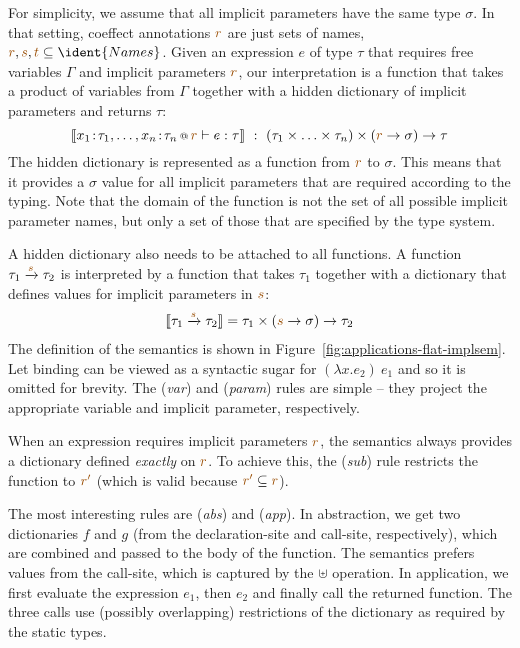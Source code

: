 For simplicity, we assume that all implicit parameters have the same type $\sigma$. In that setting, 
coeffect annotations $\aclrd{r}$ are just sets of names, \ie~$\aclrd{r}, \aclrd{s}, \aclrd{t} \subseteq \ident{Names}$.
Given an expression $e$ of type $\tau$ that requires free variables $\Gamma$ and implicit parameters 
$\aclrd{r}$, our interpretation is a function that takes a product of variables from $\Gamma$ together 
with a hidden dictionary of implicit parameters and returns $\tau$:
%
\begin{equation*}
\sem{\coctx{x_1\!:\!\tau_1, \ldots, x_n\!:\!\tau_n}{ \aclrd{r} } \vdash e : \tau} 
  ~:~ (\tau_1 \times \ldots \times \tau_n) \times (\aclrd{r} \rightarrow \sigma) \rightarrow \tau
\end{equation*}
%
The hidden dictionary is represented as a function from $\aclrd{r}$ to $\sigma$. This means that it 
provides a $\sigma$ value for all implicit parameters that are required according to the typing.
Note that the domain of the function is not the set of all possible implicit parameter names, but
only a set of those that are specified by the type system.

A hidden dictionary also needs to be attached to all functions. A function $\tau_1 \xrightarrow{\aclrd{s}} \tau_2$
is interpreted by a function that takes $\tau_1$ together with a dictionary that defines values for
implicit parameters in $\aclrd{s}$:
%
\begin{equation*}
\begin{array}{l}
\sem{\tau_1 \xrightarrow{\aclrd{s}} \tau_2} = \tau_1 \times (\aclrd{s} \rightarrow \sigma) \rightarrow \tau_2
\end{array}
\end{equation*}
%
The definition of the semantics is shown in Figure~\ref{fig:applications-flat-implsem}. Let binding
can be viewed as a syntactic sugar for $(\lambda x.e_2)~e_1$ and so it is omitted for brevity. The 
(\emph{var}) and (\emph{param}) rules are simple -- they project the appropriate variable and 
implicit parameter, respectively.

When an expression requires implicit parameters $\aclrd{r}$, the semantics always provides a 
dictionary defined \emph{exactly} on $\aclrd{r}$. To achieve this, the (\emph{sub}) rule restricts
the function to $\aclrd{r'}$ (which is valid because $\aclrd{r'} \subseteq \aclrd{r}$).

The most interesting rules are (\emph{abs}) and (\emph{app}). In abstraction, we get two dictionaries
$f$ and $g$ (from the declaration-site and call-site, respectively), which are combined and passed 
to the body of the function. The semantics prefers values from the call-site, which is captured by
the $\uplus$ operation. In application, we first evaluate the expression $e_1$, then $e_2$ and finally
call the returned function. The three calls use (possibly overlapping) restrictions of the dictionary
as required by the static types.


